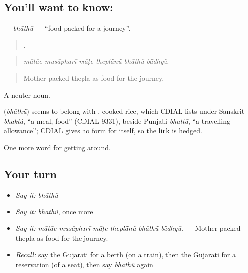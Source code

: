 \subsection*{You'll want to know: }
\textbf{} — \emph{bhāthũ} — \textquotedblleft{}food packed for a journey\textquotedblright{}.

\begin{quote}
     .
\end{quote}

\begin{quote}
\emph{mātāe musāpharī māṭe theplā̃nũ bhāthũ bā̃dhyũ.}
\end{quote}

\begin{quote}
Mother packed thepla as food for the journey.
\end{quote}

A neuter noun.

\begin{cousinweb}
\textbf{} (\emph{bhāthũ}) seems to belong with , cooked rice, which CDIAL lists under Sanskrit \emph{bhaktá}, \textquotedblleft{}a meal, food\textquotedblright{} (CDIAL 9331), beside Punjabi \emph{bhattā}, \textquotedblleft{}a travelling allowance\textquotedblright{}; CDIAL gives no form for  itself, so the link is hedged.
\end{cousinweb}

\begin{grammarlens}[title={What you've built}]
One more word for getting around.
\end{grammarlens}

\subsection*{Your turn}
\begin{itemize}
\raggedright
  \item \emph{Say it:} \emph{bhāthũ}
  \item \emph{Say it:} \emph{bhāthũ}, once more
  \item \emph{Say it:} \emph{mātāe musāpharī māṭe theplā̃nũ bhāthũ bā̃dhyũ.} — Mother packed thepla as food for the journey.
  \item \emph{Recall:} say the Gujarati for a berth (on a train), then the Gujarati for a reservation (of a seat), then say \emph{bhāthũ} again
\end{itemize}

